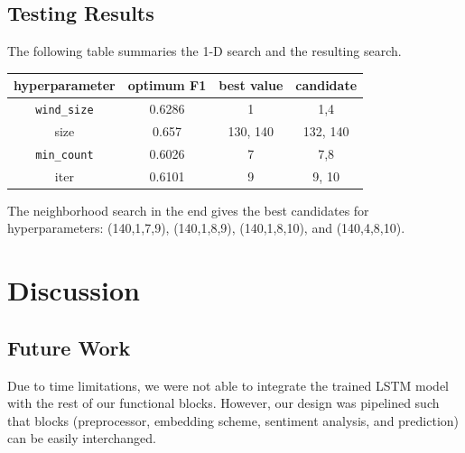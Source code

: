 \documentclass[11pt,a4paper]{article}
\begin{document}
\subsection{Testing Results}
The following table summaries the 1-D search and the resulting search. 
\begin{tabular}{|c|c|c|c|}
	\hline 
	hyperparameter & optimum F1 & best value & candidate \\
	\hline 
	\texttt{wind\_size} &  0.6286 & 1 & 1,4\\ 
	\hline 
	size & 0.657 & 130, 140  & 132, 140 \\
	\hline 
	\texttt{min\_count} & 0.6026 & 7 & 7,8 \\
	\hline 
	iter & 0.6101 & 9 & 9, 10 \\
	\hline 
\end{tabular}
The neighborhood search in the end gives the best candidates for hyperparameters: (140,1,7,9), (140,1,8,9), (140,1,8,10), and (140,4,8,10).

\section{Discussion}

\subsection{Future Work}
Due to time limitations, we were not able to integrate the trained LSTM model with the rest of our functional blocks. However, our design was pipelined such that blocks (preprocessor, embedding scheme, sentiment analysis, and prediction) can be easily interchanged. 
%
%
%
%



\appendix


	
\end{document}
